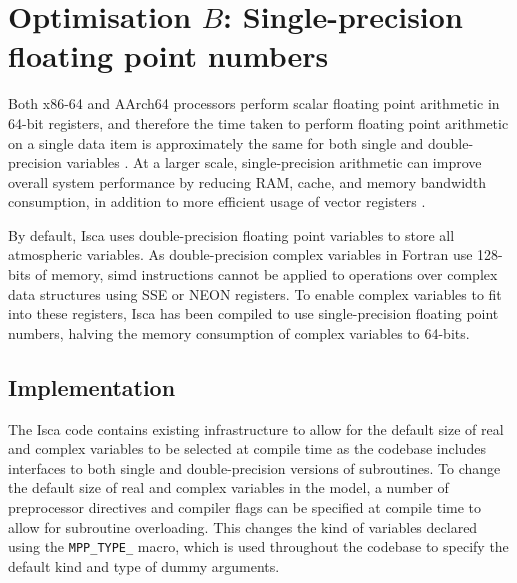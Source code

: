 \documentclass[a4paper,11pt]{report}
\begin{document}
%
%
%

















\section{Optimisation $B$: Single-precision floating point numbers}
\label{sec:floating-pont}
Both x86-64 and AArch64 processors perform scalar floating point arithmetic in 64-bit registers, and therefore the time taken to perform floating point arithmetic on a single data item is approximately the same for both single and double-precision variables \cite{reinders2013intel, aa2011armv8}.   At a larger scale, single-precision arithmetic can improve overall system performance by reducing RAM, cache, and memory bandwidth consumption, in addition to more efficient usage of vector registers \cite{goldberg1991every}.
\par
By default, Isca uses double-precision floating point variables to store all atmospheric variables. As double-precision complex variables in Fortran use 128-bits of memory, \gls{simd} instructions cannot be applied to operations over complex data structures using SSE or NEON registers. To enable complex variables to fit into these registers, Isca has been compiled to use single-precision floating point numbers, halving the memory consumption of complex variables to 64-bits.

\subsection{Implementation}
The Isca code contains existing infrastructure to allow for the default size of real and complex variables to be selected at compile time as the codebase includes interfaces to both single and double-precision versions of subroutines. To change the default size of real and complex variables in the model, a number of preprocessor directives and compiler flags can be specified at compile time to allow for subroutine overloading. This changes the kind of variables declared using the \texttt{MPP\_TYPE\_} macro, which is used throughout the codebase to specify the default kind and type of dummy arguments. 
\end{document}

